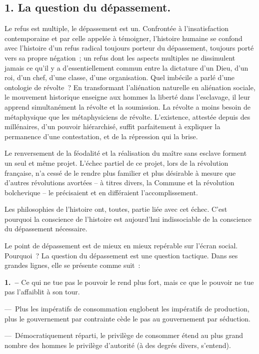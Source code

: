 \documentclass[french,twoside]{book} %
\newcommand{\labelchar}[1]{\textbf{\color{rubric} #1}}
\begin{document}
\subsection[{1. La question du dépassement.}]{\textsc{1.} La question du dépassement.}
\noindent Le refus est multiple, le dépassement est un. Confrontée à l’insatisfaction contemporaine et par celle appelée à témoigner, l’histoire humaine se confond avec l’histoire d’un refus radical toujours porteur du dépassement, toujours porté vers sa propre négation ; un refus dont les aspects multiples ne dissimulent jamais ce qu’il y a d’essentiellement commun entre la dictature d’un Dieu, d’un roi, d’un chef, d’une classe, d’une organisation. Quel imbécile a parlé d’une ontologie de révolte ? En transformant l’aliénation naturelle en aliénation sociale, le mouvement historique enseigne aux hommes la liberté dans l’esclavage, il leur apprend simultanément la révolte et la soumission. La révolte a moins besoin de métaphysique que les métaphysiciens de révolte. L’existence, attestée depuis des millénaires, d’un pouvoir hiérarchisé, suffit parfaitement à expliquer la permanence d’une contestation, et de la répression qui la brise.\par
Le renversement de la féodalité et la réalisation du maître sans esclave forment un seul et même projet. L’échec partiel de ce projet, lors de la révolution française, n’a cessé de le rendre plus familier et plus désirable à mesure que d’autres révolutions avortées – à titres divers, la Commune et la révolution bolchevique – le précisaient et en différaient l’accomplissement.\par
Les philosophies de l’histoire ont, toutes, partie liée avec cet échec. C’est pourquoi la conscience de l’histoire est aujourd’hui indissociable de la conscience du dépassement nécessaire.\par
Le point de dépassement est de mieux en mieux repérable sur l’écran social. Pourquoi ? La question du dépassement est une question tactique. Dans ses grandes lignes, elle se présente comme suit :\par
\labelchar{1. –} Ce qui ne tue pas le pouvoir le rend plus fort, mais ce que le pouvoir ne tue pas l’affaiblit à son tour.\par
— Plus les impératifs de consommation englobent les impératifs de production, plus le gouvernement par contrainte cède le pas au gouvernement par séduction.\par
— Démocratiquement réparti, le privilège de consommer étend au plus grand nombre des hommes le privilège d’autorité (à des degrés divers, s’entend).\par
\end{document}
